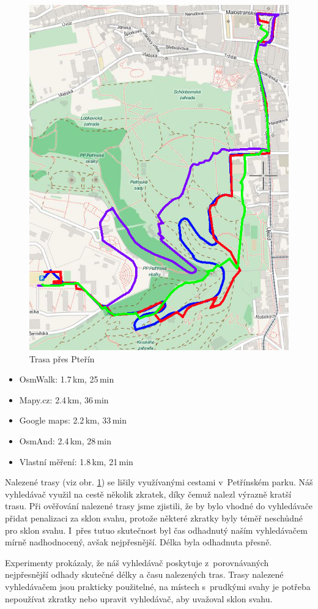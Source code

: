 \begin{figure}[h]
	\centering
	\includegraphics[width=13cm]{../img/ms-sh.png}
	\caption{Trasa přes Pteřín}
	\label{fig:ms-sh}
\end{figure}
\begin{itemize}
	\item OsmWalk: 1.7\,km, 25\,min
	\item Mapy.cz: 2.4\,km, 36\,min
	\item Google maps: 2.2\,km, 33\,min
	\item OsmAnd: 2.4\,km, 28\,min
	\item Vlastní měření: 1.8\,km, 21\,min
\end{itemize}

Nalezené trasy (viz obr. \ref{fig:ms-sh}) se lišily využívanými cestami v~Petřínském parku. Náš vyhledávač
využil na cestě několik zkratek, díky čemuž nalezl výrazně kratší trasu. Při
ověřování nalezené trasy jsme zjistili, že by bylo vhodné do vyhledávače přidat
penalizaci za sklon svahu, protože některé zkratky byly téměř neschůdné
pro sklon svahu. I~přes tutuo skutečnost byl čas odhadnutý naším vyhledávačem
mírně nadhodnocený, avšak nejpřesnější. Délka byla odhadnuta přesně.

Experimenty prokázaly, že náš vyhledávač poskytuje z~porovnávaných nejpřesnější
odhady skutečné délky a času nalezených tras. Trasy nalezené vyhledávačem jsou
prakticky použitelné, na místech s~prudkými svahy je potřeba nepoužívat zkratky
nebo upravit vyhledávač, aby uvažoval sklon svahu. 
